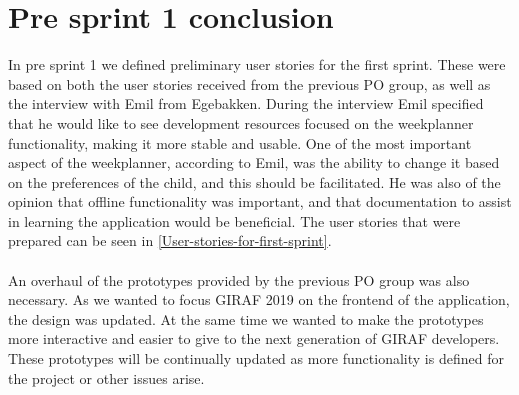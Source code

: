 \section{Pre sprint 1 conclusion}
In pre sprint 1 we defined preliminary user stories for the first sprint.
These were based on both the user stories received from the previous PO group, as well as the interview with Emil from Egebakken.
During the interview Emil specified that he would like to see development resources focused on the weekplanner functionality, making it more stable and usable.
One of the most important aspect of the weekplanner, according to Emil, was the ability to change it based on the preferences of the child, and this should be facilitated.
He was also of the opinion that offline functionality was important, and that documentation to assist in learning the application would be beneficial.
The user stories that were prepared can be seen in \autoref{User-stories-for-first-sprint}.
\\\\
An overhaul of the prototypes provided by the previous PO group was also necessary.
As we wanted to focus GIRAF 2019 on the frontend of the application, the design was updated.
At the same time we wanted to make the prototypes more interactive and easier to give to the next generation of GIRAF developers.
These prototypes will be continually updated as more functionality is defined for the project or other issues arise. 